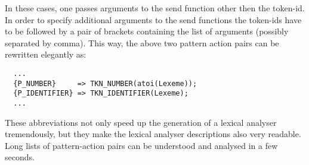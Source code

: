In these cases, one passes arguments to the send function other then the
token-id. In order to specify additional arguments to the send functions the
token-ids have to be followed by a pair of brackets containing the list of
arguments (possibly separated by comma). This way, the above two pattern
action pairs can be rewritten elegantly as:

\begin{lstlisting}
  ...
  {P_NUMBER}     => TKN_NUMBER(atoi(Lexeme));
  {P_IDENTIFIER} => TKN_IDENTIFIER(Lexeme); 
  ...
\end{lstlisting}

These abbreviations not only speed up the generation of a lexical analyser
tremendously, but they make the lexical analyser descriptions also very
readable. Long lists of pattern-action pairs can be understood and
analysed in a few seconds.

